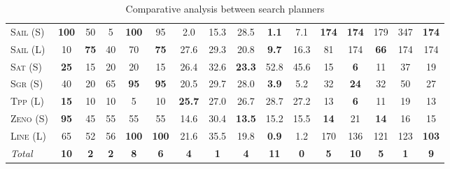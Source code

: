 \documentclass[11pt]{article}
\begin{document}
\begin{table*}[tb]
{\begin{tabular}{|l||ccccc||ccccc||ccccc||}
\textsc{Sail} (S)&\textbf{100}&50&5&\textbf{100}&95&2.0&15.3&28.5&\textbf{1.1}&7.1&\textbf{174}&\textbf{174}&179&347&\textbf{174}\\
\textsc{Sail} (L)&10&\textbf{75}&40&70&\textbf{75}&27.6&29.3&20.8&\textbf{9.7}&16.3&81&174&\textbf{66}&174&174\\
\textsc{Sat} (S)&\textbf{25}&15&20&20&15&26.4&32.6&\textbf{23.3}&52.8&45.6&15&\textbf{6}&11&37&19\\
\textsc{Sgr} (S)&40&20&65&\textbf{95}&\textbf{95}&20.5&29.7&28.0&\textbf{3.9}&5.2&32&\textbf{24}&32&50&27\\
\textsc{Tpp} (L)&\textbf{15}&10&10&5&10&\textbf{25.7}&27.0&26.7&28.7&27.2&13&\textbf{6}&11&19&13\\
\textsc{Zeno} (S)&\textbf{95}&45&55&55&55&14.6&30.4&\textbf{13.5}&15.2&15.5&\textbf{14}&21&\textbf{14}&16&15\\
\textsc{Line} (L)&65&52&56&\textbf{100}&\textbf{100}&21.6&35.5&19.8&\textbf{0.9}&1.2&170&136&121&123&\textbf{103}
\\\hline
\textit{Total}&\textbf{10}&\textbf{2}&\textbf{2}&\textbf{8}&\textbf{6}&\textbf{4}&\textbf{1}&\textbf{4}&\textbf{11}&\textbf{0}&\textbf{5}&\textbf{10}&\textbf{5}&\textbf{1}&\textbf{9}\\\hline

        \end{tabular}}
        \caption{Comparative analysis between search planners}
        \label{tab:search}
        \end{table*}
        
\end{document}
